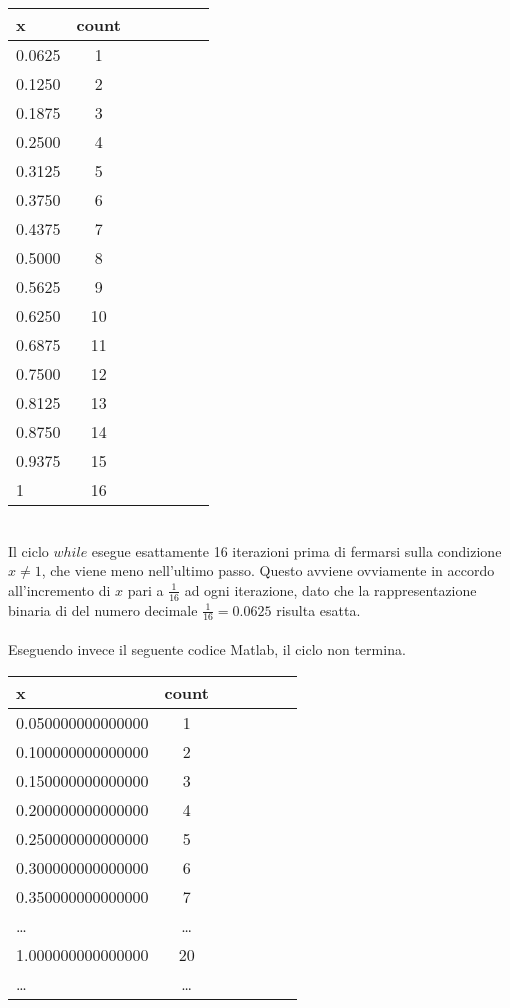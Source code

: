 \begin{center}
\footnotesize\noindent{}\end{center}




\begin{tabular}{l*{6}{c}}
 x  &  count \\
\hline
 0.0625 & 1 \\
 0.1250 & 2 \\
 0.1875 & 3 \\
 0.2500 & 4 \\
 0.3125 & 5 \\
 0.3750 & 6 \\
 0.4375 & 7 \\
 0.5000 & 8 \\
 0.5625 & 9 \\
 0.6250 & 10 \\
 0.6875 & 11 \\
 0.7500 & 12 \\
 0.8125 & 13 \\
 0.8750 & 14 \\
 0.9375 & 15 \\
      1 & 16 \\
\end{tabular} \\

\noindent Il ciclo \(while\) esegue esattamente 16 iterazioni prima di fermarsi sulla condizione \(x \neq 1\), che viene meno nell'ultimo passo. Questo avviene ovviamente in accordo all'incremento di \(x\) pari a \(\frac{1}{16}\) ad ogni iterazione, dato che la rappresentazione binaria di del numero decimale \(\frac{1}{16} = 0.0625\) risulta esatta.
\\
\\
\noindent Eseguendo invece il seguente codice Matlab, il ciclo non termina.



\begin{tabular}{l*{6}{c}}
 x  &  count \\
\hline
 0.050000000000000 & 1 \\
 0.100000000000000 & 2 \\
 0.150000000000000 & 3 \\
 0.200000000000000 & 4 \\
 0.250000000000000 & 5 \\
 0.300000000000000 & 6 \\
 0.350000000000000 & 7 \\
 \ldots & \ldots \\
 1.000000000000000 & 20 \\
 \ldots & \ldots \\
\end{tabular} \\

